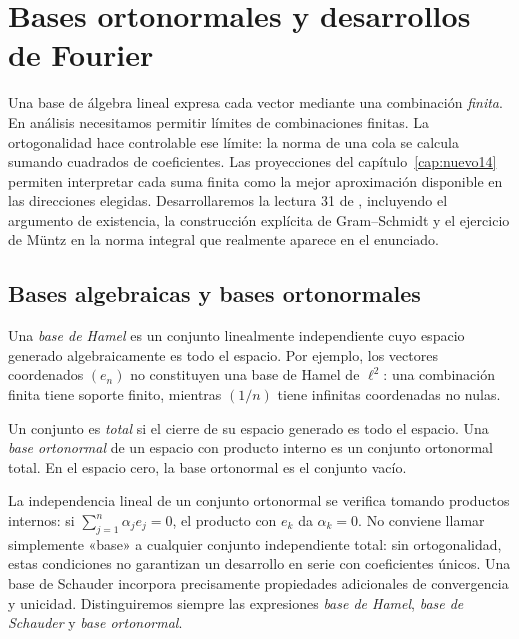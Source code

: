 \chapter{Bases ortonormales y desarrollos de Fourier}\label{cap:nuevo15}\label{chap:31}

Una base de álgebra lineal expresa cada vector mediante una combinación \emph{finita}. En análisis necesitamos permitir límites de combinaciones finitas. La ortogonalidad hace controlable ese límite: la norma de una cola se calcula sumando cuadrados de coeficientes. Las proyecciones del capítulo~\ref{cap:nuevo14} permiten interpretar cada suma finita como la mejor aproximación disponible en las direcciones elegidas. Desarrollaremos la lectura 31 de \cite{valencia}, incluyendo el argumento de existencia, la construcción explícita de Gram--Schmidt y el ejercicio de Müntz en la norma integral que realmente aparece en el enunciado.

\section{Bases algebraicas y bases ortonormales}
\label{lectura:31}
Una \emph{base de Hamel} es un conjunto linealmente independiente cuyo espacio generado algebraicamente es todo el espacio. Por ejemplo, los vectores coordenados $(e_n)$ no constituyen una base de Hamel de $\ell^{2}$: una combinación finita tiene soporte finito, mientras $(1/n)$ tiene infinitas coordenadas no nulas.

\begin{definicion}
Un conjunto es \emph{total} si el cierre de su espacio generado es todo el espacio. Una \emph{base ortonormal} de un espacio con producto interno es un conjunto ortonormal total. En el espacio cero, la base ortonormal es el conjunto vacío.
\end{definicion}
La independencia lineal de un conjunto ortonormal se verifica tomando productos internos: si $\sum_{j=1}^{n}\alpha_je_j=0$, el producto con $e_k$ da $\alpha_k=0$. No conviene llamar simplemente «base» a cualquier conjunto independiente total: sin ortogonalidad, estas condiciones no garantizan un desarrollo en serie con coeficientes únicos. Una base de Schauder incorpora precisamente propiedades adicionales de convergencia y unicidad. Distinguiremos siempre las expresiones \emph{base de Hamel}, \emph{base de Schauder} y \emph{base ortonormal}.

